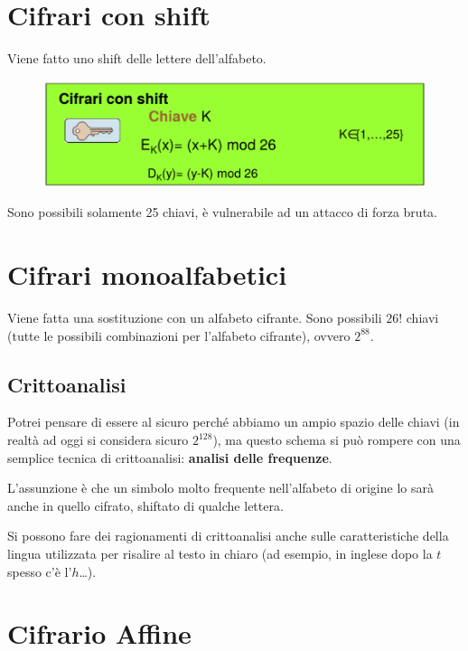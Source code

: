 \section{Cifrari con shift}

Viene fatto uno shift delle lettere dell'alfabeto.

\begin{figure}[H]
    \centering
    \includegraphics[width=0.8\linewidth]{chapters/chap02/images/shift.png}
\end{figure}

Sono possibili solamente 25 chiavi, è vulnerabile ad un attacco di forza bruta.

\section{Cifrari monoalfabetici}

Viene fatta una sostituzione con un alfabeto cifrante. Sono possibili $26!$ chiavi 
(tutte le possibili combinazioni per l'alfabeto cifrante), ovvero $2^{88}$.

\subsection{Crittoanalisi}

Potrei pensare di essere al sicuro perché abbiamo un ampio spazio delle chiavi 
(in realtà ad oggi si considera sicuro $2^{128}$), ma questo schema si può rompere 
con una semplice tecnica di crittoanalisi: \textbf{analisi delle frequenze}.

\noindent L'assunzione è che un simbolo molto frequente nell'alfabeto di origine 
lo sarà anche in quello cifrato, shiftato di qualche lettera.

\noindent Si possono fare dei ragionamenti di crittoanalisi anche sulle caratteristiche della lingua utilizzata 
per risalire al testo in chiaro (ad esempio, in inglese dopo la $t$ spesso c'è l'$h$\dots).

\section{Cifrario Affine}

